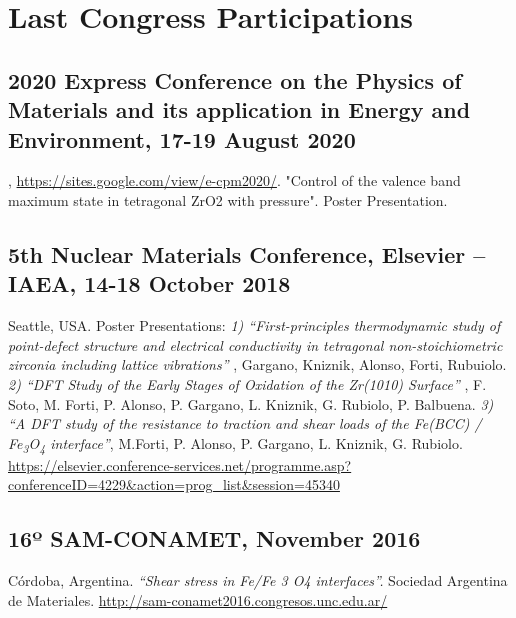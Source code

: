 \section{Last Congress Participations}

\subsection{
  2020 Express Conference on the Physics of Materials and its application in Energy and Environment,
  17-19 August 2020
}, \href{on-lineevent}{  https://sites.google.com/view/e-cpm2020/}.
"Control of the valence band maximum   state in tetragonal ZrO2 with pressure". Poster Presentation.

\subsection{ 5th Nuclear Materials Conference, Elsevier – IAEA, 14-18 October 2018} Seattle, USA. Poster Presentations:
\emph{ 1) “First-principles thermodynamic study of point-defect structure and electrical conductivity in tetragonal non-stoichiometric zirconia including lattice vibrations”} , Gargano, Kniznik, Alonso, Forti, Rubuiolo. \emph{ 2) “DFT Study of the Early Stages of Oxidation of the Zr(1010) Surface”} , F. Soto, M. Forti, P. Alonso, P. Gargano, L. Kniznik, G. Rubiolo, P. Balbuena. \emph{ 3) “A DFT study of the resistance to traction and shear loads of the Fe(BCC) / Fe\textsubscript{3}O\textsubscript{4} interface”}, M.Forti, P. Alonso, P. Gargano, L. Kniznik, G. Rubiolo. 
\url{https://elsevier.conference-services.net/programme.asp?conferenceID=4229&action=prog_list&session=45340}

\subsection{16º SAM-CONAMET, November 2016} Córdoba, Argentina. \emph{“Shear stress in Fe/Fe 3 O4 interfaces”. }Sociedad Argentina de Materiales. \url{http://sam-conamet2016.congresos.unc.edu.ar/}

